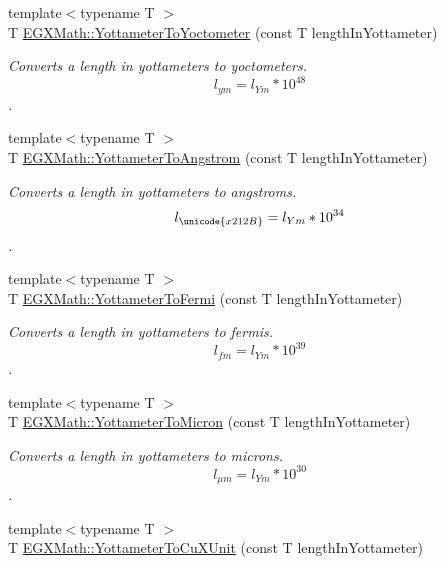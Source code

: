 \begin{DoxyCompactItemize}
{\footnotesize template$<$typename T $>$ }\\T \mbox{\hyperlink{group___e_g_x_math-_conversions-_length_conversions-_s_i-_yottameter-_s_i_ga946a366f9c912aaa81ab052567f86bc2}{E\+G\+X\+Math\+::\+Yottameter\+To\+Yoctometer}} (const T length\+In\+Yottameter)
\begin{DoxyCompactList}\small\item\em Converts a length in yottameters to yoctometers. \[ l_{ym}=l_{Ym} * 10^{48} \]. \end{DoxyCompactList}\item 
{\footnotesize template$<$typename T $>$ }\\T \mbox{\hyperlink{group___e_g_x_math-_conversions-_length_conversions-_s_i-_yottameter-_non-_s_i_ga0129b788ceb2d7d4ce86c155ee9d4675}{E\+G\+X\+Math\+::\+Yottameter\+To\+Angstrom}} (const T length\+In\+Yottameter)
\begin{DoxyCompactList}\small\item\em Converts a length in yottameters to angstroms. \[ l_{\unicode{x212B}}=l_{Ym} * 10^{34} \]. \end{DoxyCompactList}\item 
{\footnotesize template$<$typename T $>$ }\\T \mbox{\hyperlink{group___e_g_x_math-_conversions-_length_conversions-_s_i-_yottameter-_non-_s_i_gabf900c05975691fab8c5df7de16a467c}{E\+G\+X\+Math\+::\+Yottameter\+To\+Fermi}} (const T length\+In\+Yottameter)
\begin{DoxyCompactList}\small\item\em Converts a length in yottameters to fermis. \[ l_{fm}=l_{Ym} * 10^{39} \]. \end{DoxyCompactList}\item 
{\footnotesize template$<$typename T $>$ }\\T \mbox{\hyperlink{group___e_g_x_math-_conversions-_length_conversions-_s_i-_yottameter-_non-_s_i_gaad96d515763b1dfbcd968020e1b97de4}{E\+G\+X\+Math\+::\+Yottameter\+To\+Micron}} (const T length\+In\+Yottameter)
\begin{DoxyCompactList}\small\item\em Converts a length in yottameters to microns. \[ l_{\mu m}=l_{Ym} * 10^{30} \]. \end{DoxyCompactList}\item 
{\footnotesize template$<$typename T $>$ }\\T \mbox{\hyperlink{group___e_g_x_math-_conversions-_length_conversions-_s_i-_yottameter-_non-_s_i_ga5c8a9868ad238225dbf8ebdbfad13930}{E\+G\+X\+Math\+::\+Yottameter\+To\+Cu\+X\+Unit}} (const T length\+In\+Yottameter)

\end{DoxyCompactItemize}
